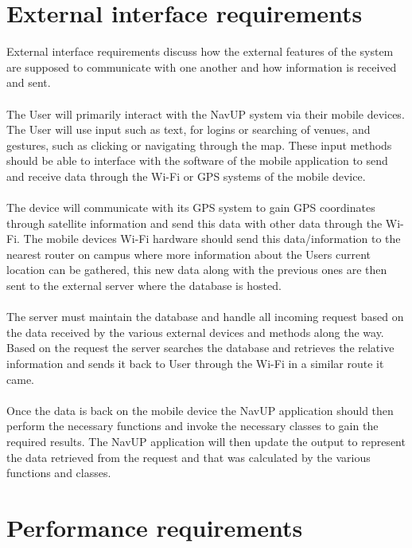\documentclass[english]{article}
\begin{document}
	\section{External interface requirements}
External interface requirements discuss how the external features of the system are supposed to communicate with one another and how information is received and sent.\\\\
The User will primarily interact with the NavUP system via their mobile devices. The User will use input such as text, for logins or searching of venues, and gestures, such as clicking or navigating through the map. These input methods should be able to interface with the software of the mobile application to send and receive data through the Wi-Fi or GPS systems of the mobile device. \\\\
The device will communicate with its GPS system to gain GPS coordinates through satellite information and send this data with other data through the Wi-Fi. The mobile devices Wi-Fi hardware should send this data/information to the nearest router on campus where more information about the Users current location can be gathered, this new data along with the previous ones are then sent to the external server where the database is hosted.\\\\
The server must maintain the database and handle all incoming request based on the data received by the various external devices and methods along the way. Based on the request the server searches the database and retrieves the relative information and sends it back to User through the Wi-Fi in a similar route it came.\\\\
Once the data is back on the mobile device the NavUP application should then perform the necessary functions and invoke the necessary classes to gain the required results. The NavUP application will then update the output to represent the data retrieved from the request and that was calculated by the various functions and classes.

	\section{Performance requirements}
\end{document}
